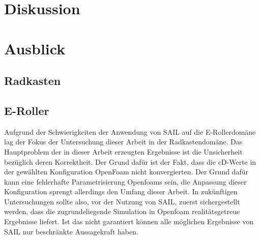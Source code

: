 \section{Diskussion}


\section{Ausblick}

\subsection{Radkasten}

\subsection{E-Roller}

Aufgrund der Schwierigkeiten der Anwendung von SAIL auf die E-Rollerdomäne lag der Fokus der Untersuchung dieser Arbeit in der Radkastendomäne.
Das Hauptproblem der in dieser Arbeit erzeugten Ergebnisse ist die Unsicherheit bezüglich deren Korrektheit.
Der Grund dafür ist der Fakt, dass die cD-Werte in der gewählten Konfiguration OpenFoam nicht konvergierten.
Der Grund dafür kann eine fehlerhafte Parametrisierung Openfoams sein, die Anpassung dieser Konfiguration sprengt allerdings den Umfang dieser Arbeit.
In zukünftigen Untersuchungen sollte also, vor der Nutzung von SAIL, zuerst sichergestellt werden, dass die zugrundeliegende Simulation in Openfoam realitätsgetreue Ergebnisse liefert.
Ist das nicht garantiert können alle möglichen Ergebnisse von SAIL nur beschränkte Aussagekraft haben.

